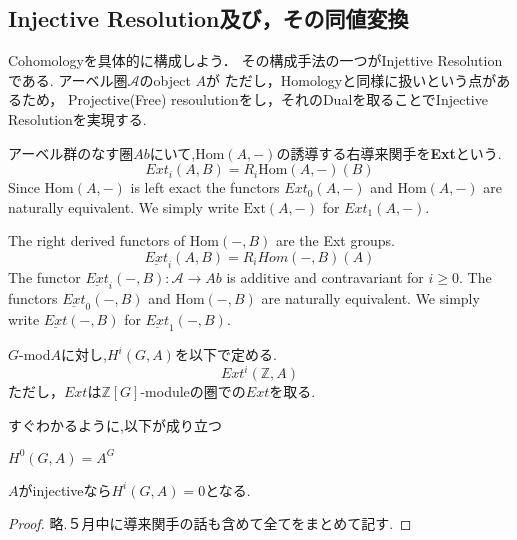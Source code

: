 \documentclass{ujarticle}
\renewenvironment{enumerate}
{
\begin{list}{(\arabic{enumi})}
{
\usecounter{enumi}
\setlength{\topsep}{0zh}
\setlength{\itemindent}{0zw}
\setlength{\leftmargin}{2zw} %
\setlength{\rightmargin}{0zw} %
\setlength{\labelsep}{1zw} %
\setlength{\labelwidth}{3zw} %
\setlength{\itemsep}{0em} %
\setlength{\parsep}{0em} %
\setlength{\listparindent}{1zw} %
}
}{
\end{list}
}
\begin{document}
\subsection{Injective Resolution及び，その同値変換}
\label{sub:Injective Resolution及び，その同値変換}
Cohomologyを具体的に構成しよう．
その構成手法の一つがInjettive Resolutionである.
アーベル圏$\mathcal{A}$のobject $A$が
ただし，Homologyと同様に扱いという点があるため，
Projective(Free) resoulutionをし，それのDualを取ることでInjective Resolutionを実現する.

\begin{dfn}
アーベル群のなす圏$Ab$にいて,$\mathrm{Hom}(A, −)$の誘導する右導来関手を\textbf{Ext}という.
\begin{equation*}
  Ext_i(A, B) = R_i\mathrm{Hom}(A, −)(B)
\end{equation*}
Since $\mathrm{Hom}(A, −)$ is left exact the functors $Ext_0
(A, −)$ and $\mathrm{Hom}(A, −)$ are naturally equivalent. We simply write
$\mathrm{Ext}(A, −)$ for $Ext_1(A, −)$.
\end{dfn}

\begin{dfn}
The right derived functors of $\mathrm{Hom}(−, B)$ are the Ext groups.
\begin{equation*}
  \underline{Ext}_i(A, B) = R_iHom(−, B)(A)
\end{equation*}
 The functor $\underline{Ext}_i(−, B) : \mathcal{A} \to Ab$ is additive and contravariant for $i \ge 0$.
 The functors
 $\underline{Ext}_0(−, B)$ and $\mathrm{Hom}(−, B)$ are naturally equivalent.
We simply write $\underline{Ext}(−, B)$ for $\underline{Ext}_1(−, B)$.
\end{dfn}

\begin{dfn}
 $G$-mod$A$に対し,$H^i(G,A)$を以下で定める.
 \begin{equation*}
  Ext^i(\mathbb{Z},A)
 \end{equation*}
 ただし，$Ext$は$\mathbb{Z}[G]$-moduleの圏での$Ext$を取る.
\end{dfn}
すぐわかるように,以下が成り立つ
\begin{lem}
 \begin{enumerate}
   \item $H^0(G,A)=A^G$
   \item $A$がinjectiveなら$H^i(G,A)=0$となる.
 \end{enumerate}
\end{lem}
\begin{proof}
 略.５月中に導来関手の話も含めて全てをまとめて記す.
\end{proof}
\end{document}

